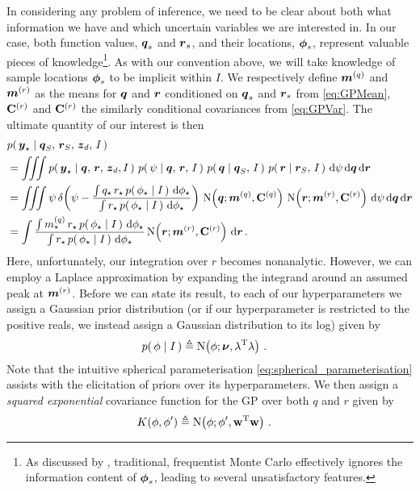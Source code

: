 \documentclass{acmtrans2m}
\begin{document}
In considering any problem of inference, we need to be clear about both what information we have and which uncertain variables we are interested in. In our case, both function values, $\boldsymbol{q}_s$ and $\boldsymbol{r}_s$, and their locations, $\boldsymbol{\phi}_s$, represent valuable pieces of knowledge\footnote{As discussed by \cite{MCUnsound}, traditional, frequentist Monte Carlo effectively ignores the information content of $\boldsymbol{\phi}_s$, leading to several unsatisfactory features.}. As with our convention above, we will take knowledge of sample locations $\boldsymbol{\phi}_s$ to be implicit within $I$. We respectively define $\boldsymbol{m}^{(q)}$ and $\boldsymbol{m}^{(r)}$ as the means for $\boldsymbol{q}$ and $\boldsymbol{r}$ conditioned on $\boldsymbol{q}_s$ and $\boldsymbol{r}_s$ from \eqref{eq:GPMean}, $\mathbf{C}^{(r)}$ and $\mathbf{C}^{(r)}$ the similarly conditional covariances from \eqref{eq:GPVar}. The ultimate quantity of our interest is then
\begin{align}
&\p{\vyst}{\vect{q}_S,\,\vect{r}_S,\,\vzD,\,I} \nonumber\\  
& = \iiint \p{\vyst}{\vect{q},\,\vect{r},\,\vzD,I}\,\p{\psi}{\vect{q},\,\vect{r},\,I}\,\p{\vect{q}}{\vect{q}_S,\,I}\,\p{\vect{r}}{\vect{r}_S,\,I}\,\ud\psi\, \ud \vect{q}\,\ud \vect{r} \nonumber\\
& = \iiint \psi\,\dd{\psi}{\frac{\int q_\star\,r_\star\,\p{\phst}{I}\,\ud\phst}
{\int r_\star\,\p{\phst}{I}\,\ud\phst}}\, \N{\vect{q}}{\vect{m}^{(q)}}{\mat{C}^{(q)}}\, \N{\vect{r}}{\vect{m}^{(r)}}{\mat{C}^{(r)}}\,\ud\psi\, \ud \vect{q}\,\ud \vect{r} \nonumber \\
& = \int \frac{\int m^{(q)}_\star\,r_\star\,\p{\phst}{I}\,\ud\phst}
{\int r_\star\,\p{\phst}{I}\,\ud\phst}\, \N{\vect{r}}{\vect{m}^{(r)}}{\mat{C}^{(r)}}\,\ud \vect{r}\,.
\end{align}
Here, unfortunately, our integration over $r$ becomes nonanalytic. However, we can employ a Laplace approximation by expanding the integrand around an assumed peak at $\boldsymbol{m}^{(r)}$. Before we can state its result, to each of our hyperparameters we assign a Gaussian prior distribution (or if our hyperparameter is restricted to the positive reals, we instead assign a Gaussian distribution to its log) given by
\begin{align}
 p\!\left(\,\phi\mid I\,\right) & \triangleq \text{N}\!\left(\phi;\boldsymbol{\nu},\mathbf{\lambda}^{\mathrm{T}} \mathbf{\lambda}\right) \label{eq:phiprior}\,.
\end{align}
Note that the intuitive spherical parameterisation \eqref{eq:spherical_parameterisation} assists with the elicitation of priors over its hyperparameters. We then assign a {\em squared exponential} covariance function for the GP over both $q$ and $r$ given by
\begin{align}
 K(\phi,\phi') & \triangleq \text{N}\!\left(\phi;\phi',\mathbf{w}^{\mathrm{T}} \mathbf{w}\right) \label{eq:BMCsqdexp}\,.
\end{align}
\end{document}
